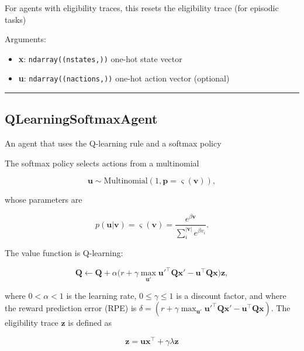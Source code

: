 For agents with eligibility traces, this resets the eligibility trace
(for episodic tasks)

Arguments:

\begin{itemize}
\tightlist
\item
  \textbf{x}: \texttt{ndarray((nstates,))} one-hot state vector
\item
  \textbf{u}: \texttt{ndarray((nactions,))} one-hot action vector
  (optional)
\end{itemize}

\begin{center}\rule{0.5\linewidth}{\linethickness}\end{center}

\hypertarget{qlearningsoftmaxagent}{%
\subsection{QLearningSoftmaxAgent}\label{qlearningsoftmaxagent}}

\begin{Shaded}
\begin{Highlighting}[]
\end{Highlighting}
\end{Shaded}

An agent that uses the Q-learning rule and a softmax policy

The softmax policy selects actions from a multinomial

\[
\mathbf u \sim \mathrm{Multinomial}(1, \mathbf p=\varsigma(\mathbf v)),
\]

whose parameters are

\[
p(\mathbf u|\mathbf v) = \varsigma(\mathbf v) = \frac{e^{\beta \mathbf v}}{\sum_{i}^{|\mathbf v|} e^{\beta v_i}}.
\]

The value function is Q-learning:

\[
\mathbf Q \gets \mathbf Q + \alpha \big(r + \gamma \max_{\mathbf u'} \mathbf u'^\top \mathbf Q \mathbf x' - \mathbf u^\top \mathbf Q \mathbf x \big) \mathbf z,
\]

where \(0 < \alpha < 1\) is the learning rate, \(0 \leq \gamma \leq 1\)
is a discount factor, and where the reward prediction error (RPE) is
\(\delta = (r + \gamma \max_{\mathbf u'} \mathbf u'^\top \mathbf Q \mathbf x' - \mathbf u^\top \mathbf Q \mathbf x)\).
The eligibility trace \(\mathbf z\) is defined as

\[
\mathbf z = \mathbf u \mathbf x^\top +  \gamma \lambda \mathbf z
\]

